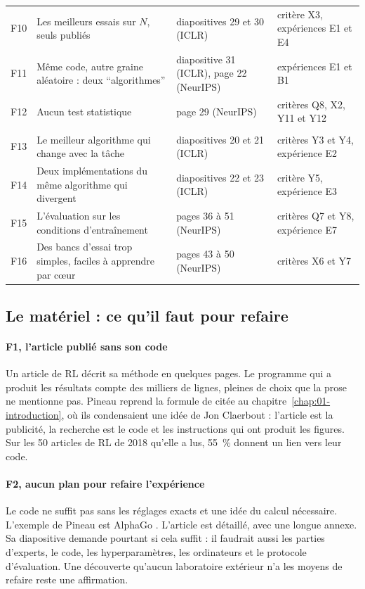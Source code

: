 \begin{small}
\begin{longtable}{@{}>{\raggedright\arraybackslash}p{0.6cm} >{\raggedright\arraybackslash}p{5.3cm} >{\raggedright\arraybackslash}p{3.6cm} >{\raggedright\arraybackslash}p{4.4cm}@{}}
F10 & Les meilleurs essais sur $N$, seuls publiés & diapositives 29 et 30 (ICLR) & critère X3, expériences E1 et E4 \\
F11 & Même code, autre graine aléatoire : deux \enquote{algorithmes} & diapositive 31 (ICLR), page 22 (NeurIPS) & expériences E1 et B1 \\
F12 & Aucun test statistique & page 29 (NeurIPS) & critères Q8, X2, Y11 et Y12 \\
\midrule
\multicolumn{4}{@{}l}{\emph{La portée des conclusions}} \\
F13 & Le meilleur algorithme qui change avec la tâche & diapositives 20 et 21 (ICLR) & critères Y3 et Y4, expérience E2 \\
F14 & Deux implémentations du même algorithme qui divergent & diapositives 22 et 23 (ICLR) & critère Y5, expérience E3 \\
F15 & L'évaluation sur les conditions d'entraînement & pages 36 à 51 (NeurIPS) & critères Q7 et Y8, expérience E7 \\
F16 & Des bancs d'essai trop simples, faciles à apprendre par cœur & pages 43 à 50 (NeurIPS) & critères X6 et Y7 \\
\end{longtable}
\end{small}

\subsection{Le matériel : ce qu'il faut pour refaire}

\paragraph{F1, l'article publié sans son code}
Un article de RL décrit sa méthode en quelques pages. Le programme qui a produit les résultats compte
des milliers de lignes, pleines de choix que la prose ne mentionne pas. Pineau reprend la formule de
\textcite{buckheit1995wavelab} citée au chapitre~\ref{chap:01-introduction}, où ils condensaient une idée de Jon Claerbout :
l'article est la publicité, la recherche est le code et les instructions qui ont produit les figures.
Sur les 50 articles de RL de 2018 qu'elle a lus, 55~\% donnent un lien vers leur code.

\paragraph{F2, aucun plan pour refaire l'expérience}
Le code ne suffit pas sans les réglages exacts et une idée du calcul nécessaire. L'exemple de Pineau
est AlphaGo \parencite{silver2016alphago}. L'article est détaillé, avec une longue annexe. Sa
diapositive demande pourtant si cela suffit : il faudrait aussi les parties d'experts, le code, les
hyperparamètres, les ordinateurs et le protocole d'évaluation. Une découverte qu'aucun laboratoire
extérieur n'a les moyens de refaire reste une affirmation.

